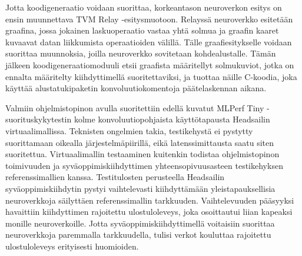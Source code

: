 \documentclass[12pt,a4paper,finnish
]{tunithesis}
\begin{document}
Jotta koodigeneraatio voidaan suorittaa, korkeantason neuroverkon esitys on ensin muunnettava TVM Relay -esitysmuotoon.
Relayssä neuroverkko esitetään graafina, jossa jokainen laskuoperaatio vastaa yhtä solmua ja graafin kaaret kuvaavat datan liikkumista operaatioiden välillä.
Tälle graafiesitykselle voidaan suorittaa muunnoksia, joilla neuroverkko sovitetaan kohdealustalle.
Tämän jälkeen koodigeneraatiomoduuli etsii graafista määritellyt solmukuviot, jotka on ennalta määritelty kiihdyttimellä suoritettaviksi, ja tuottaa näille C-koodia, joka käyttää alustatukipaketin konvoluutiokomentoja päätelaskennan aikana.

Valmiin ohjelmistopinon avulla suoritettiin edellä kuvatut MLPerf Tiny -suo\-ri\-tus\-ky\-ky\-tes\-tin kolme konvoluutiopohjaista käyttötapausta Headsailin virtuaalimallissa.
Teknisten ongelmien takia, testikehystä ei pystytty suorittamaan oikealla jär\-jes\-tel\-mä\-pii\-ri\-llä, eikä latenssimittausta saatu siten suoritettua. Virtuaalimallin testaaminen kuitenkin todistaa ohjelmistopinon toimivuuden ja sy\-vä\-op\-pi\-mis\-kiih\-dy\-tti\-men yhteensopivuusasteen testikehyksen referenssimallien kanssa.
Testitulosten perusteella Headsailin sy\-vä\-op\-pi\-mis\-kiih\-dy\-tin pystyi vaihtelevasti kiihdyttämään yleistapauksellisia neuroverkkoja säilyttäen referenssimallin tarkkuuden.
Vaihtelevuuden pääsyyksi havaittiin kiihdyttimen rajoitettu ulostuloleveys, joka osoittautui liian kapeaksi monille neuroverkoille.
Jotta syväoppimiskiihdyttimellä voitaisiin suorittaa neuroverkkoja paremmalla tarkkuudella, tulisi verkot kouluttaa rajoitettu ulostuloleveys erityisesti huomioiden.







%
%
\newpage

\printbibliography[title=Lähteet]


%
\end{document}

